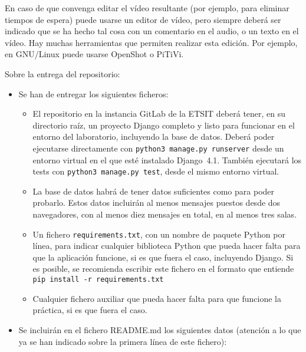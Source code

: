 \begin{enumerate}
En caso de que convenga editar el vídeo resultante (por ejemplo, para eliminar tiempos de espera) puede usarse un editor de vídeo, pero siempre deberá ser indicado que se ha hecho tal cosa con un comentario en el audio, o un texto en el vídeo. Hay muchas herramientas que permiten realizar esta edición. Por ejemplo, en GNU/Linux puede usarse OpenShot o PiTiVi.

\end{enumerate}

Sobre la entrega del repositorio:
\begin{itemize}
  \item Se han de entregar los siguientes ficheros:

\begin{itemize}
  \item El repositorio en la instancia GitLab de la ETSIT deberá tener, en su directorio raíz, un proyecto Django completo y listo para funcionar en el entorno del laboratorio, incluyendo la base de datos. Deberá poder ejecutarse directamente con \verb|python3 manage.py runserver| desde un entorno virtual en el que esté instalado Django~4.1. También ejecutará los tests con \verb|python3 manage.py test|, desde el mismo entorno virtual.

  \item La base de datos habrá de tener datos suficientes como para poder probarlo. Estos datos incluirán al menos mensajes puestos desde dos navegadores, con al menos diez mensajes en total, en al menos tres salas.

  \item Un fichero \verb|requirements.txt|, con un nombre de paquete Python por línea, para indicar cualquier biblioteca Python que pueda hacer falta para que la aplicación funcione, si es que fuera el caso, incluyendo Django. Si es posible, se recomienda escribir este fichero en el formato que entiende \verb|pip install -r requirements.txt|

  \item Cualquier fichero auxiliar que pueda hacer falta para que funcione la práctica, si es que fuera el caso.
\end{itemize}

  \item Se incluirán en el fichero README.md los siguientes datos (atención a lo que ya se han indicado sobre la primera línea de este fichero):


\end{itemize}
